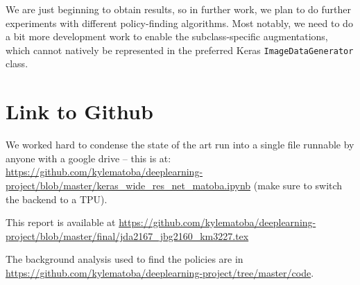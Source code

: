 \documentclass[10pt,twocolumn,letterpaper]{article}
\begin{document}
  We are just beginning to obtain results, so in further work, we plan to do further experiments with different policy-finding algorithms. Most notably, we need to do a bit more development work to enable the subclass-specific augmentations, which cannot natively be represented in the preferred Keras \texttt{ImageDataGenerator} class.

\section{Link to Github}

  We worked hard to condense the state of the art run into a single file runnable by anyone with a google drive -- this is at: \url{https://github.com/kylematoba/deeplearning-project/blob/master/keras_wide_res_net_matoba.ipynb} (make sure to switch the backend to a TPU).

  This report is available at \url{https://github.com/kylematoba/deeplearning-project/blob/master/final/jda2167_jbg2160_km3227.tex}

  The background analysis used to find the policies are in \url{https://github.com/kylematoba/deeplearning-project/tree/master/code}.


\nocite{Torralba2008}
{\small


}
\end{document}
